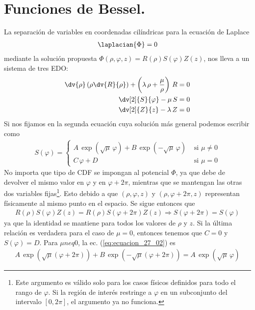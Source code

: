 \section{Funciones de Bessel.}
La separación de variables en coordenadas cilíndricas para la ecuación de Laplace
\begin{align*}
\laplacian{\Phi} = 0
\end{align*}
mediante la solución propuesta $\Phi (\rho, \varphi, z) = R(\rho) S(\varphi) Z(z)$, nos lleva a un sistema de tres EDO:
\begin{align}
\begin{aligned}
\dv{\rho} \left( \rho \dv{R}{\rho} \right) + \left( \lambda \, \rho + \dfrac{\mu}{\rho} \right) \, R &= 0 \\
\dv[2]{S}{\varphi} - \mu \, S &= 0 \\
\dv[2]{Z}{z} - \lambda \, Z &= 0
\end{aligned}
\label{eq:ecuacion_27_01}
\end{align}
Si nos fijamos en la segunda ecuación cuya solución más general podemos escribir como
\begin{align}
S (\varphi) = \begin{cases}
A \, \exp(\sqrt{\mu} \, \varphi) + B \, \exp(-\sqrt{\mu} \, \varphi) & \mbox{ si } \mu \neq 0 \\
C \,\varphi + D & \mbox { si } \mu = 0
\end{cases}
\label{eq:ecuacion_27_02}
\end{align}
No importa que tipo de CDF se impongan al potencial $\Phi$, ya que debe de devolver el mismo valor en $\varphi$ y en $\varphi + 2 \pi$, mientras que se mantengan las otras dos variables fijas\footnote{Este argumento es válido solo para los casos físicos definidos para todo el rango de $\varphi$. Si la región de interés restringe a $\varphi$ en un subconjunto del intervalo $[0, 2 \pi]$, el argumento ya no funciona.}. Esto debido a que $(\rho, \varphi, z)$ y $(\rho, \varphi + 2 \pi, z)$ representan físicamente al mismo punto en el espacio. Se sigue entonces que
\begin{align*}
R(\rho) S(\varphi) Z(z) = R(\rho) S(\varphi + 2 \pi) Z(z) \Longrightarrow S(\varphi + 2 \pi) = S (\varphi)
\end{align*}
ya que la identidad se mantiene para todos los valores de $\rho$ y $z$. Si la última relación es verdadera para el caso de $\mu = 0$, entonces tenemos que $C = 0$ y $S(\varphi) = D$. Para $\mu neq 0$, la ec. (\ref{eq:ecuacion_27_02}) es
\begin{align*}
A \, \exp(\sqrt{\mu}(\varphi + 2 \pi)) + B \, \exp(- \sqrt{\mu}(\varphi + 2 \pi)) = A \, \exp(\sqrt{\mu} \, \varphi) 
\end{align*}
